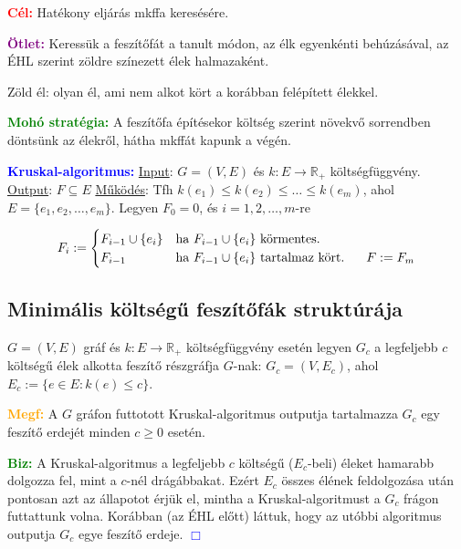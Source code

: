 \documentclass[../szamtud.tex]{subfiles}
\begin{document}
        \textcolor{red}{\textbf{Cél:}} Hatékony eljárás mkffa keresésére.
        
        \textcolor{purple}{\textbf{Ötlet:}} Keressük a feszítőfát a tanult módon, az élk egyenkénti behúzásával, az ÉHL szerint zöldre színezett élek halmazaként. 

        Zöld él: olyan él, ami nem alkot kört a korábban felépített élekkel.

        \textcolor{green}{\textbf{Mohó stratégia:}} A feszítőfa építésekor költség szerint növekvő sorrendben döntsünk az élekről, hátha mkffát kapunk a végén.

        \textcolor{blue}{\textbf{Kruskal-algoritmus:}} \underline{Input}: $G=(V,E)$ és $k:E \rightarrow \mathbb{R}_+$ költségfüggvény. \underline{Output}: $F \subseteq E$ \underline{Működés}: Tfh $k(e_1) \leq k(e_2) \leq \dots \leq k(e_m)$, ahol $E=\{e_1,e_2,\dots, e_m\}$. Legyen $F_0=0$, és $i=1,2,\dots,m$-re

            \begin{equation*}
                F_i :=\begin{cases}
                    F_{i-1}\cup \{e_i\} & \text{ha $F_{i-1}\cup \{e_i\}$ körmentes.} \\
                    F_{i-1} & \text{ha $F_{i-1}\cup \{e_i\}$ tartalmaz kört. \;\;\; $F:=F_m$}
                \end{cases}
            \end{equation*}

    \subsection{Minimális költségű feszítőfák struktúrája}

        $G=(V,E)$ gráf és $k:E \rightarrow \mathbb{R}_+$ költségfüggvény esetén legyen $G_c$ a legfeljebb $c$ költségű élek alkotta feszítő részgráfja $G$-nak: $G_c = (V,E_c)$, ahol $E_c := \{e \in E : k(e)\leq c\}$.

        \textcolor{orange}{\textbf{Megf:}} A $G$ gráfon futtotott Kruskal-algoritmus outputja tartalmazza $G_c$ egy feszítő erdejét minden $c \geq 0$ esetén.

        \textcolor{green}{\textbf{Biz:}} A Kruskal-algoritmus a legfeljebb $c$ költségű ($E_c$-beli) éleket hamarabb dolgozza fel, mint a $c$-nél drágábbakat. Ezért $E_c$ összes élének feldolgozása után pontosan azt az állapotot érjük el, mintha a Kruskal-algoritmust a $G_c$ frágon futtattunk volna. Korábban (az ÉHL előtt) láttuk, hogy az utóbbi algoritmus outputja $G_c$ egye feszítő erdeje. \textcolor{blue}{$\Box$} 
\end{document}
